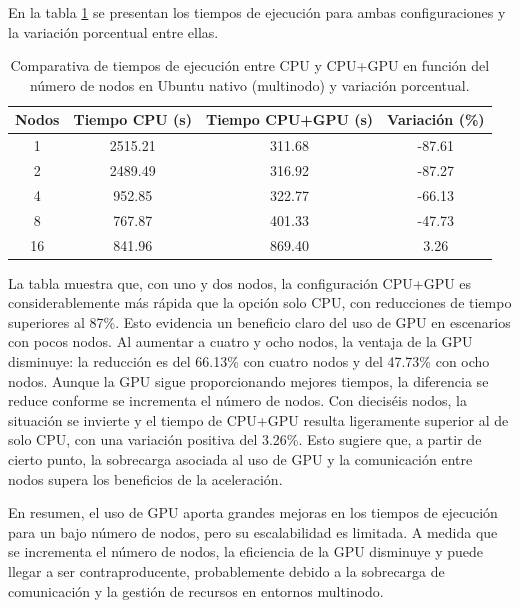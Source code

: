 En la tabla \ref{tab:multi-node_ubuntu_cpu_vs_gpu_native} se presentan los tiempos de ejecución para ambas configuraciones y la variación porcentual entre ellas.

\begin{table}[ht]
    \centering
    \begin{tabular}{|c|c|c|c|}
        \hline
        \textbf{Nodos} & \textbf{Tiempo CPU (s)} & \textbf{Tiempo CPU+GPU (s)} & \textbf{Variación (\%)} \\
        \hline
        1              & 2515.21                 & 311.68                      & -87.61                  \\
        2              & 2489.49                 & 316.92                      & -87.27                  \\
        4              & 952.85                  & 322.77                      & -66.13                  \\
        8              & 767.87                  & 401.33                      & -47.73                  \\
        16             & 841.96                  & 869.40                      & 3.26                    \\
        \hline
    \end{tabular}
    \caption{Comparativa de tiempos de ejecución entre CPU y CPU+GPU en función del número de nodos en Ubuntu nativo (multinodo) y variación porcentual.}
    \label{tab:multi-node_ubuntu_cpu_vs_gpu_native}
\end{table}

La tabla muestra que, con uno y dos nodos, la configuración CPU+GPU es considerablemente más rápida que la opción solo CPU, con reducciones de tiempo superiores al 87\%. Esto evidencia un beneficio claro del uso de GPU en escenarios con pocos nodos. Al aumentar a cuatro y ocho nodos, la ventaja de la GPU disminuye: la reducción es del 66.13\% con cuatro nodos y del 47.73\% con ocho nodos. Aunque la GPU sigue proporcionando mejores tiempos, la diferencia se reduce conforme se incrementa el número de nodos. Con dieciséis nodos, la situación se invierte y el tiempo de CPU+GPU resulta ligeramente superior al de solo CPU, con una variación positiva del 3.26\%. Esto sugiere que, a partir de cierto punto, la sobrecarga asociada al uso de GPU y la comunicación entre nodos supera los beneficios de la aceleración.

En resumen, el uso de GPU aporta grandes mejoras en los tiempos de ejecución para un bajo número de nodos, pero su escalabilidad es limitada. A medida que se incrementa el número de nodos, la eficiencia de la GPU disminuye y puede llegar a ser contraproducente, probablemente debido a la sobrecarga de comunicación y la gestión de recursos en entornos multinodo.

